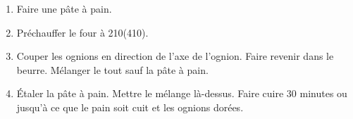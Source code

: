 
\begin{ingredients}
\end{ingredients}


\begin{recipe}
  \begin{enumerate}

  \item Faire une p\^ate \`a pain.

  \item Pr\'echauffer le four \`a 210\C (410\F).

  \item Couper les ognions en direction de l'axe de l'ognion.
    Faire revenir dans le beurre.
    M\'elanger le tout sauf la p\^ate \`a pain.

  \item \'Etaler la p\^ate \`a pain.  Mettre le m\'elange
    l\`a-dessus.  Faire cuire 30 minutes ou jusqu'\`a ce que le pain
    soit cuit et les ognions dor\'ees.

  \end{enumerate}
\end{recipe}
